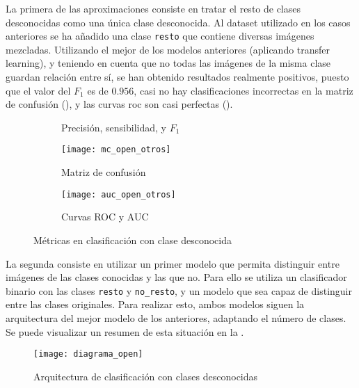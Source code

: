 				La primera de las aproximaciones consiste en tratar el resto de clases desconocidas como una única clase desconocida. Al dataset utilizado en los casos anteriores se ha añadido una clase \texttt{resto} que contiene diversas imágenes mezcladas. Utilizando el mejor de los modelos anteriores (aplicando transfer learning), y teniendo en cuenta que no todas las imágenes de la misma clase guardan relación entre sí, se han obtenido resultados realmente positivos, puesto que el valor del $F_1$ es de $0.956$, casi no hay clasificaciones incorrectas en la matriz de confusión (), y las curvas \gls{roc} son casi perfectas (). \\
				
				\begin{figure}[!h]
					\centering
					\begin{subfigure}{.5\textwidth}
						\centering
						
						\caption{Precisión, sensibilidad, y $F_1$}
						\label{fig:m_open_otros}
					\end{subfigure}
					\begin{subfigure}{.5\textwidth}
						\centering
						\texttt{[image: mc\_open\_otros]}
						\caption{Matriz de confusión}
						\label{fig:mc_open_otros}
					\end{subfigure}\hfill
					\begin{subfigure}{.5\textwidth}
						\centering
						\texttt{[image: auc\_open\_otros]}
						\caption{Curvas ROC y AUC}
						\label{fig:roc_open_otros}
					\end{subfigure}
					\caption{Métricas en clasificación con clase desconocida}
					\label{fig:clase_otros}
				\end{figure}
				
				La segunda consiste en utilizar un primer modelo que permita distinguir entre imágenes de las clases conocidas y las que no. Para ello se utiliza un clasificador binario con las clases \texttt{resto} y \texttt{no\_resto}, y un modelo que sea capaz de distinguir entre las clases originales. Para realizar esto, ambos modelos siguen la arquitectura del mejor modelo de los anteriores, adaptando el número de clases. Se puede visualizar un resumen de esta situación en la . \\
				
				\begin{figure}[!h]
					\texttt{[image: diagrama\_open]} 
					\caption{Arquitectura de clasificación con clases desconocidas}
					\label{fig:openset}
				\end{figure}
				

